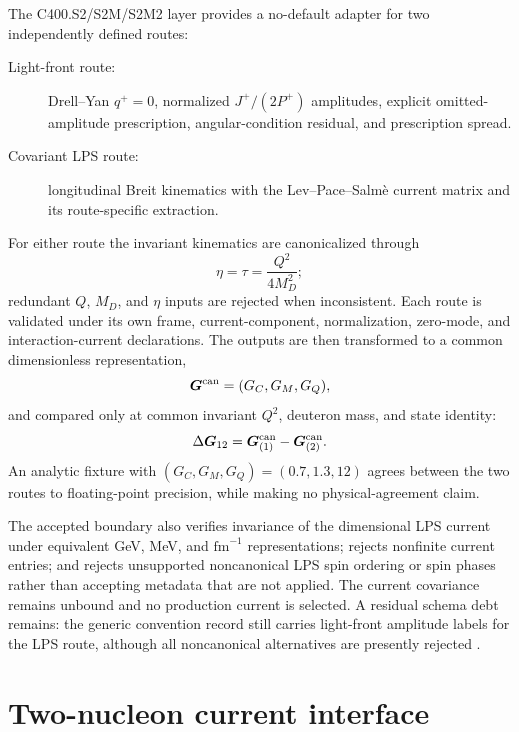 \documentclass[11pt,oneside]{book}
\newcommand{\fm}{\mathrm{fm}}
\begin{document}
The C400.S2/S2M/S2M2 layer provides a no-default adapter for two independently defined routes:
\begin{description}
 \item[Light-front route:] Drell--Yan $q^+=0$, normalized $J^+/(2P^+)$ amplitudes, explicit omitted-amplitude prescription, angular-condition residual, and prescription spread.
 \item[Covariant LPS route:] longitudinal Breit kinematics with the Lev--Pace--Salm\`e current matrix and its route-specific extraction.
\end{description}
For either route the invariant kinematics are canonicalized through
\begin{equation}
 \eta=\tau=\frac{Q^2}{4M_D^2};
 \label{eq:current-canonical-eta}
\end{equation}
redundant $Q$, $M_D$, and $\eta$ inputs are rejected when inconsistent.  Each route is validated under its own frame, current-component, normalization, zero-mode, and interaction-current declarations.  The outputs are then transformed to a common dimensionless representation,
\begin{equation}
 \bm G^{\rm can}=(G_C,G_M,G_Q),
 \label{eq:canonical-current-output}
\end{equation}
and compared only at common invariant $Q^2$, deuteron mass, and state identity:
\begin{equation}
 \Delta\bm G_{12}
 =\bm G^{\rm can}_{(1)}-\bm G^{\rm can}_{(2)}.
 \label{eq:canonical-current-difference}
\end{equation}
An analytic fixture with $(G_C,G_M,G_Q)=(0.7,1.3,12)$ agrees between the two routes to floating-point precision, while making no physical-agreement claim.

The accepted boundary also verifies invariance of the dimensional LPS current under equivalent GeV, MeV, and $\fm^{-1}$ representations; rejects nonfinite current entries; and rejects unsupported noncanonical LPS spin ordering or spin phases rather than accepting metadata that are not applied.  The current covariance remains unbound and no production current is selected.  A residual schema debt remains: the generic convention record still carries light-front amplitude labels for the LPS route, although all noncanonical alternatives are presently rejected \cite{DWC400S2Record2026}.

\section{Two-nucleon current interface}
\end{document}
